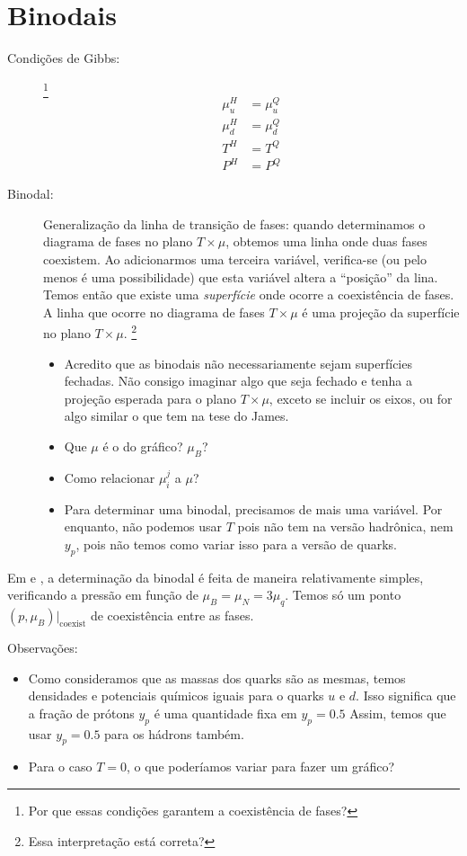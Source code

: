 \chapter{Binodais}

\begin{description}
\item[Condições de Gibbs:]\footnote{Por que essas condições garantem a coexistência de fases?}
\begin{align}
	\mu_u^H &= \mu_u^Q \\
	\mu_d^H &= \mu_d^Q \\
	T^H &= T^Q \\
	P^H &= P^Q
\end{align}

\item[Binodal:] Generalização da linha de transição de fases: quando determinamos o diagrama de fases no plano $T \times \mu$, obtemos uma linha onde duas fases coexistem. Ao adicionarmos uma terceira variável, verifica-se (ou pelo menos é uma possibilidade) que esta variável altera a ``posição'' da lina. Temos então que existe uma \emph{superfície} onde ocorre a coexistência de fases. A linha que ocorre no diagrama de fases $T \times \mu$ é uma projeção da superfície no plano $T \times \mu$. \footnote{Essa interpretação está correta?}
	\begin{itemize}
		\item Acredito que as binodais não necessariamente sejam superfícies fechadas. Não consigo imaginar algo que seja fechado e tenha a projeção esperada para o plano $T \times \mu$, exceto se incluir os eixos, ou for algo similar o que tem na tese do James.
		\item Que $\mu$ é o do gráfico? $\mu_B$?
		\item Como relacionar $\mu_i^j$ a $\mu$?
		\item Para determinar uma binodal, precisamos de mais uma variável. Por enquanto, não podemos usar $T$ pois não tem na versão hadrônica, nem $y_p$, pois não temos como variar isso para a versão de quarks.
	\end{itemize}
\end{description}



Em \textcite{japoneses} e \textcite{japoneses2}, a determinação da binodal é feita de maneira relativamente simples, verificando a pressão em função de $\mu_B = \mu_N = 3\mu_q$. Temos só um ponto $(p, \mu_B)|_{\textrm{coexist}}$ de coexistência entre as fases.

Observações:
\begin{itemize}
	\item Como consideramos que as massas dos quarks são as mesmas, temos densidades e potenciais químicos iguais para o quarks $u$ e $d$. Isso significa que a fração de prótons $y_p$ é uma quantidade fixa em $y_p = 0.5$ Assim, temos que usar $y_p = 0.5$ para os hádrons também.
	\item Para o caso $T = 0$, o que poderíamos variar para fazer um gráfico? 
\end{itemize}